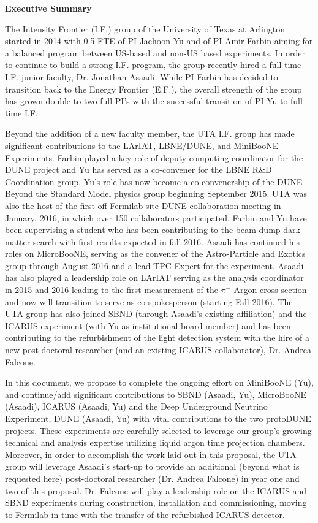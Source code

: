 \begin{center}
\textbf{ \Large{Executive Summary} }
\end{center}

The Intensity Frontier (I.F.) group of the University of Texas at Arlington started in 2014 with 0.5 FTE of PI Jaehoon Yu and of PI Amir Farbin aiming for a balanced program between US-based and non-US based experiments. In order to continue to build a strong I.F. program, the group recently hired a full time I.F. junior faculty, Dr. Jonathan Asaadi. While PI Farbin has decided to transition back to the Energy Frontier (E.F.), the overall strength of the group has grown double to two full PI's with the successful transition of PI Yu to full time I.F.

Beyond the addition of a new faculty member, the UTA I.F. group has made significant contributions to the LArIAT, LBNE/DUNE, and MiniBooNE Experiments. Farbin played a key role of deputy computing coordinator for the DUNE project and Yu has served as a co-convener for the LBNE R$\&$D Coordination group. Yu's role has now become a co-convenership of the DUNE Beyond the Standard Model physics group beginning September 2015. UTA was also the host of the first off-Fermilab-site DUNE collaboration meeting in January, 2016, in which over 150 collaborators participated. Farbin and Yu have been supervising a student who has been contributing to the beam-dump dark matter search with first results expected in fall 2016. Asaadi has continued his roles on MicroBooNE, serving as the convener of the Astro-Particle and Exotics group through August 2016 and a lead TPC-Expert for the experiment. Asaadi has also played a leadership role on LArIAT serving as the analysis coordinator in 2015 and 2016 leading to the first measurement of the $\pi^{-}$-Argon cross-section and now will transition to serve as co-spokesperson (starting Fall 2016). The UTA group has also joined SBND (through Asaadi's existing affiliation) and the ICARUS experiment (with Yu as institutional board member) and has been contributing to the refurbishment of the light detection system with the hire of a new post-doctoral researcher (and an existing ICARUS collaborator), Dr. Andrea Falcone.

In this document, we propose to complete the ongoing effort on MiniBooNE (Yu), and continue/add significant contributions to SBND (Asaadi, Yu), MicroBooNE (Asaadi), ICARUS (Asaadi, Yu) and the Deep Underground Neutrino Experiment, DUNE (Asaadi, Yu) with vital contributions to the two protoDUNE projects. These experiments are carefully selected to leverage our group's growing technical and analysis expertise utilizing liquid argon time projection chambers. Moreover, in order to accomplish the work laid out in this proposal, the UTA group will leverage Asaadi's start-up to provide an additional (beyond what is requested here) post-doctoral researcher (Dr. Andrea Falcone) in year one and two of this proposal. Dr. Falcone will play a leadership role on the ICARUS and SBND experiments during construction, installation and commissioning, moving to Fermilab in time with the transfer of the refurbished ICARUS detector.

